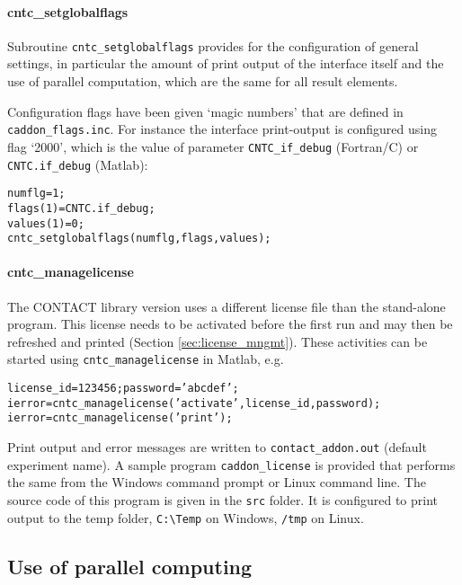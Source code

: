 \documentclass[12pt]{report}
\begin{document}
\paragraph{cntc\_setglobalflags}

Subroutine {\tt cntc\_setglobalflags} provides for the configuration of
general settings, in particular the amount of print output of the
interface itself and the use of parallel computation, which are the same
for all result elements.

Configuration flags have been given `magic numbers' that are defined in {\tt 
caddon\_flags.inc}. For instance the interface
print-output is configured using flag `2000', which is the value of
parameter {\tt CNTC\_if\_debug} (Fortran/C) or {\tt CNTC.if\_debug} (Matlab):
\begin{alltt}\small
    numflg    = 1;             % configure idebug = 0 in the CONTACT library
    flags(1)  = CNTC.if_debug;
    values(1) = 0;
    cntc_setglobalflags(numflg, flags, values);
\end{alltt}

\paragraph{cntc\_managelicense}

The CONTACT library version uses a different license file than the
stand-alone program. This license needs to be activated before the first
run and may then be refreshed and printed (Section \ref{sec:license_mngmt}).
These activities can be started using {\tt cntc\_manage\-li\-cense} in Matlab,
e.g.\
\begin{alltt}\small
    license_id = 123456; password = 'abcdef';
    ierror = cntc_managelicense('activate', license_id, password);
    ierror = cntc_managelicense('print');
\end{alltt}
Print output and error messages are written to {\tt contact\_addon.out}
(default experiment name). A sample program {\tt caddon\_license} is
provided that performs the same from the Windows command prompt or Linux
command line. The source code of this program is given in the {\tt src}
folder. It is configured to print output to the temp folder, \verb+C:\Temp+
on Windows, \verb+/tmp+ on Linux.

\subsection{Use of parallel computing}
\end{document}
